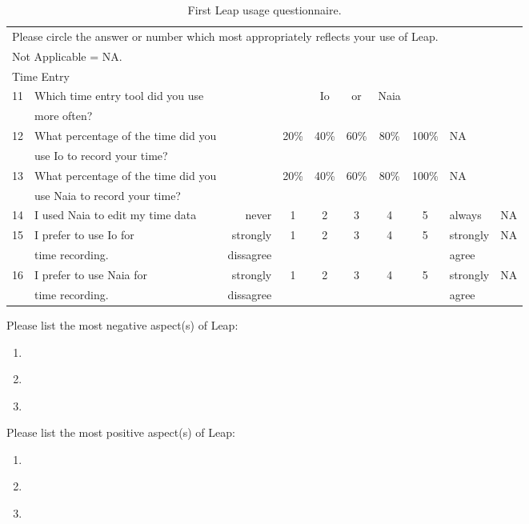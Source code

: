 \label{sec:questionaire-leap}
\begin{table}[htbp]
  \caption{First Leap usage questionnaire.}  
  \begin{tabular}{rlrccccclc}\\
    \multicolumn{8}{l}{Please circle the answer or number which most
    appropriately reflects your use of Leap.} \\
    \multicolumn{8}{l}{ Not Applicable = NA.} \\ \hline
    \hline
    \multicolumn{10}{l}{Time Entry}\\ \hline
    11&Which time entry tool did you use&&&Io&or&Naia\\
    &more often?\\ \hline
    12&What percentage of the time did you &&20\%&40\%&60\%&80\%&100\%&NA\\
    &use Io to record your time?\\ \hline
    13&What percentage of the time did you &&20\%&40\%&60\%&80\%&100\%&NA\\
    &use Naia to record your time?\\ \hline
    14&I used Naia to edit my time data&never&1&2&3&4&5&always&NA\\ \hline
    15&I prefer to use Io for &strongly&1&2&3&4&5&strongly&NA\\
    &time recording.&dissagree&&&&&&agree \\ \hline
    16&I prefer to use Naia for &strongly&1&2&3&4&5&strongly&NA\\
    &time recording.&dissagree&&&&&&agree \\ \hline
    \hline
  \end{tabular}
\end{table}

Please list the most negative aspect(s) of Leap:

\begin{enumerate}

\item{   }

\item{   }

\item{   }
\end{enumerate}

Please list the most positive aspect(s) of Leap:

\begin{enumerate}

\item{   }

\item{   }

\item{   }
\end{enumerate}

